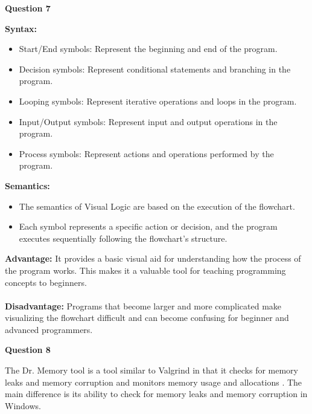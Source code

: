 \documentclass{article}
\begin{document}
\begin{center}
    \large
    \textbf{Question 7}
    \normalsize
\end{center}
\textbf{Syntax:} \cite{visuallogic}
\begin{itemize}
    \item Start/End symbols: Represent the beginning and end of the program.
    \item Decision symbols: Represent conditional statements and branching in the program.
    \item Looping symbols: Represent iterative operations and loops in the program.
    \item Input/Output symbols: Represent input and output operations in the program.
    \item Process symbols: Represent actions and operations performed by the program.
\end{itemize}
\textbf{Semantics:} \cite{flowchart}
\begin{itemize}
    \item The semantics of Visual Logic are based on the execution of the flowchart.
    \item Each symbol represents a specific action or decision, and the program executes sequentially following the flowchart's structure.
\end{itemize}
\textbf{Advantage:}
It provides a basic visual aid for understanding how the process of the program works. This makes it a valuable tool for teaching programming concepts to beginners.\\\\
\textbf{Disadvantage:}
Programs that become larger and more complicated make visualizing the flowchart difficult and can become confusing for beginner and advanced programmers.\\


\begin{center}
    \large
    \textbf{Question 8}
    \normalsize
\end{center}
The Dr. Memory tool is a tool similar to Valgrind in that it checks for memory leaks and memory corruption and monitors memory usage and allocations \cite{drmemory}. The main difference is its ability to check for memory leaks and memory corruption in Windows. \cite{chromium-drmemory} \\



\end{document}
